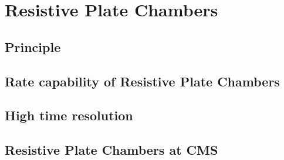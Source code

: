 \graphicspath{{chapt_dutch/}{intro/}{chapt2/}{chapt3/}{chapt4/}{chapt5/}{chapt6/}{chapt7/}{chapt8/}}

\renewcommand\evenpagerightmark{{\scshape\small Chapter 4}}
\renewcommand\oddpageleftmark{{\scshape\small Resistive Plate Chambers}}

\renewcommand{\bibname}{References}

\hyphenation{}

\chapter[Resistive Plate Chambers]%
{Resistive Plate Chambers}
\label{chapt:4}

\section{Principle}
\label{sec:principle}

\section{Rate capability of Resistive Plate Chambers}
\label{sec:RateCapa}

\section{High time resolution}
\label{sec:TimeRes}

\section{Resistive Plate Chambers at CMS}
\label{sec:CMS-RPC}

\clearpage{\pagestyle{empty}\cleardoublepage}
